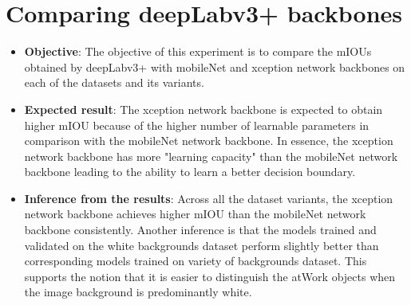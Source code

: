 \section{Comparing deepLabv3+ backbones}

	\begin{itemize}
		\item \textbf{Objective}: The objective of this experiment is to compare the mIOUs obtained by deepLabv3+ with mobileNet and xception network backbones on each of the datasets and its variants.
		\item \textbf{Expected result}: The xception network backbone is expected to obtain higher mIOU because of the higher number of learnable parameters in comparison with the mobileNet network backbone. In essence, the xception network backbone has more "learning capacity" than the mobileNet network backbone leading to the ability to learn a better decision boundary.
		\item \textbf{Inference from the results}: Across all the dataset variants, the xception network backbone achieves higher mIOU than the mobileNet network backbone consistently. Another inference is that the models trained and validated on the white backgrounds dataset perform slightly better than corresponding models trained on variety of backgrounds dataset. This supports the notion that it is easier to distinguish the atWork objects when the image background is predominantly white.
	\end{itemize}

